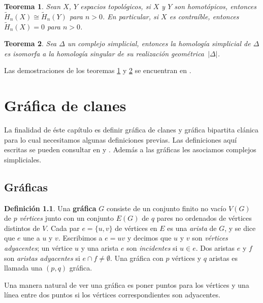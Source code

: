 \documentclass[12pt]{book}
\newtheorem{theorem}{Teorema}[section]
\theoremstyle{definition}
\newtheorem{definition}[theorem]{Definición}
\newcounter{in}
\newcounter{ini}
\begin{document}
\begin{theorem}
  Sean $X$, $Y$ espacios topológicos, si $X$ y $Y$ son homotópicos, entonces $\widetilde H_{n}(X)\cong \widetilde
  H_{n}(Y)$ para $n>0$. En particular, si $X$ es contraíble, entonces $\widetilde
  H_{n}(X)=0$ para $n>0$.
  \label{esp-homotopicos-homologias-iso}
\end{theorem}

\begin{theorem}
  Sea $\Delta$ un complejo simplicial, entonces la homología
  simplicial de $\Delta$ es isomorfa a la homología singular de su
  realización geométrica~$|\Delta|$.
  \label{homologia-realizacion}
\end{theorem}
Las demostraciones de los teoremas
\ref{esp-homotopicos-homologias-iso} y \ref{homologia-realizacion} se
encuentran en \cite{munkres1984elements}.
 
\chapter{Gráfica de clanes}
\label{cha:grafica-clanes}

La finalidad de éste capítulo es definir gráfica de clanes y gráfica
bipartita clánica para lo cual necesitamos algunas definiciones previas. Las definiciones aquí
escritas se pueden consultar en \cite{harary} y \cite{LPV08a}. Además
a las gráficas les asociamos complejos simpliciales.

\section{Gráficas}
\label{graficas}

\begin{definition}
  Una \textbf{gráfica} $G$ consiste de un conjunto finito no vacío $V(G)$
  de $p$ \emph{vértices} junto con un conjunto $E(G)$ de $q$ pares no
  ordenados de vértices distintos de $V$. Cada par $e=\{u,v\}$ de vértices
  en $E$ es una \emph{arista} de $G$, y se dice que $e$ une a $u$ y
  $v$. Escribimos a $e=uv$ y decimos que $u$ y $v$ son \emph{vértices
    adyacentes}; un vértice $u$ y una arista $e$ son \emph{incidentes}
  si $u\in e$. Dos aristas $e$ y $f$ son \emph{aristas adyacentes}
  si $e\cap f\neq\emptyset$. Una gráfica con $p$ vértices y $q$
  aristas es llamada una $(p,q)$ gráfica.

  Una manera natural de ver una gráfica es poner puntos para los
  vértices y una línea entre dos puntos si los vértices correspondientes
  son adyacentes.
\end{definition}
\end{document}
